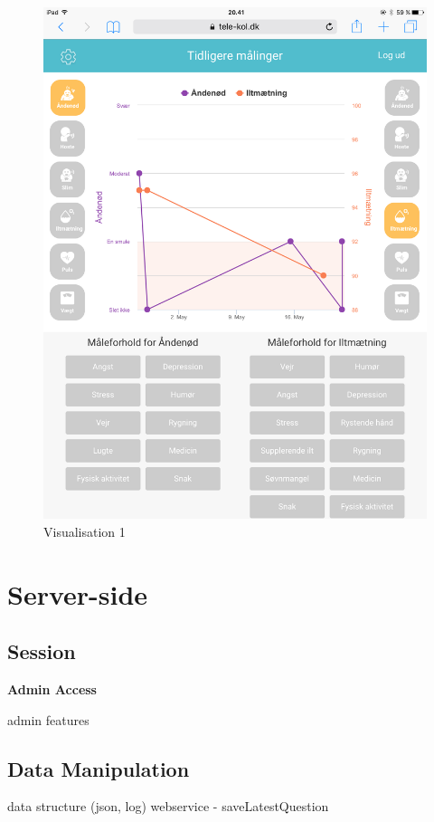 \begin{figure}[h]
\begin{minipage}[b]{0.45\textwidth}
    \includegraphics[width=\textwidth]{images/implementation/v1Imp.PNG}
    \caption{Visualisation 1}
    \label{fig:visualization}
  \end{minipage}
\end{figure}



\section{Server-side}


\subsection{Session}



\textbf{Admin Access}

admin features


\subsection{Data Manipulation}
data structure (json, log)
webservice - saveLatestQuestion

